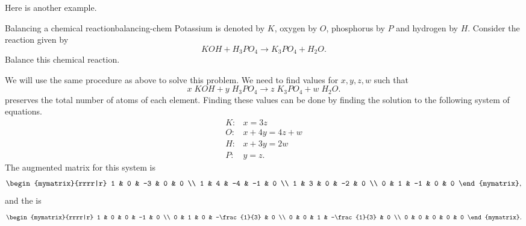 Here is another example.

\begin{example}{Balancing a chemical reaction}{balancing-chem}
Potassium is denoted by $K$, oxygen by $O$,
phosphorus by $P$ and hydrogen by $H$.
Consider the reaction given by
\begin{equation*}
KOH+H_{3}PO_{4}\rightarrow K_{3}PO_{4}+H_{2}O.
\end{equation*}
Balance this chemical reaction.
\end{example}

\begin{solution}
We will use the same procedure as above to solve this problem. We need to find values for
$x,y,z,w$ such that
\begin{equation*}
x\;KOH+y\;H_{3}PO_{4}\rightarrow z\;K_{3}PO_{4}+w\;H_{2}O.
\end{equation*}
preserves the total number of atoms of each element.
Finding these values can be done by finding the solution to the following system of equations.
\begin{equation*}
\begin{array}{cl}
K: & x=3z \\
O: & x+4y=4z+w \\
H: & x+3y=2w \\
P: & y=z.
\end{array}
\end{equation*}
The augmented matrix for this system is
\begin{equation*}
\begin{mymatrix}{rrrr|r}
1 & 0 & -3 & 0 & 0 \\
1 & 4 & -4 & -1 & 0 \\
1 & 3 & 0 & -2 & 0 \\
0 & 1 & -1 & 0 & 0
\end{mymatrix},
\end{equation*}
and the {\rref} is
\begin{equation*}
\def\arraystretch{1.2}
\begin{mymatrix}{rrrr|r}
1 & 0 & 0 & -1 & 0 \\
0 & 1 & 0 & -\frac{1}{3} & 0 \\
0 & 0 & 1 & -\frac{1}{3} & 0 \\
0 & 0 & 0 & 0 & 0
\end{mymatrix}.
\end{equation*}


\end{solution}
